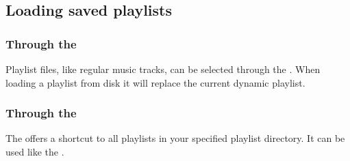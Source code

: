 \subsection{Loading saved playlists}
\subsubsection{Through the }
Playlist files, like regular music tracks, can be selected through the 
. When loading a playlist from disk it will replace
the current dynamic playlist.

\subsubsection{Through the }
The  offers a shortcut to all playlists in your
\daps{} specified playlist directory.
It can be used like the .

